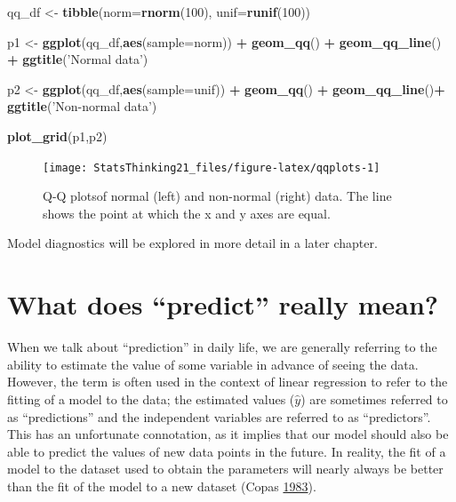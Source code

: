 \documentclass[12pt,]{book}
\newenvironment{Shaded}{\begin{snugshade}}{\end{snugshade}}
\newcommand{\DataTypeTok}[1]{\textcolor[rgb]{0.13,0.29,0.53}{#1}}
\newcommand{\DecValTok}[1]{\textcolor[rgb]{0.00,0.00,0.81}{#1}}
\newcommand{\KeywordTok}[1]{\textcolor[rgb]{0.13,0.29,0.53}{\textbf{#1}}}
\newcommand{\NormalTok}[1]{#1}
\newcommand{\OperatorTok}[1]{\textcolor[rgb]{0.81,0.36,0.00}{\textbf{#1}}}
\newcommand{\StringTok}[1]{\textcolor[rgb]{0.31,0.60,0.02}{#1}}
\theoremstyle{definition}
\theoremstyle{definition}
\theoremstyle{definition}
\theoremstyle{remark}
\begin{document}
\begin{Shaded}
\begin{Highlighting}[]
\NormalTok{qq_df <-}\StringTok{ }\KeywordTok{tibble}\NormalTok{(}\DataTypeTok{norm=}\KeywordTok{rnorm}\NormalTok{(}\DecValTok{100}\NormalTok{),}
                \DataTypeTok{unif=}\KeywordTok{runif}\NormalTok{(}\DecValTok{100}\NormalTok{))}

\NormalTok{p1 <-}\StringTok{ }\KeywordTok{ggplot}\NormalTok{(qq_df,}\KeywordTok{aes}\NormalTok{(}\DataTypeTok{sample=}\NormalTok{norm)) }\OperatorTok{+}\StringTok{ }
\StringTok{  }\KeywordTok{geom_qq}\NormalTok{() }\OperatorTok{+}\StringTok{ }
\StringTok{  }\KeywordTok{geom_qq_line}\NormalTok{() }\OperatorTok{+}\StringTok{ }
\StringTok{  }\KeywordTok{ggtitle}\NormalTok{(}\StringTok{'Normal data'}\NormalTok{)}

\NormalTok{p2 <-}\StringTok{ }\KeywordTok{ggplot}\NormalTok{(qq_df,}\KeywordTok{aes}\NormalTok{(}\DataTypeTok{sample=}\NormalTok{unif)) }\OperatorTok{+}\StringTok{ }
\StringTok{  }\KeywordTok{geom_qq}\NormalTok{() }\OperatorTok{+}\StringTok{ }
\StringTok{  }\KeywordTok{geom_qq_line}\NormalTok{()}\OperatorTok{+}\StringTok{ }
\StringTok{  }\KeywordTok{ggtitle}\NormalTok{(}\StringTok{'Non-normal data'}\NormalTok{)}

\KeywordTok{plot_grid}\NormalTok{(p1,p2)}
\end{Highlighting}
\end{Shaded}

\begin{figure}
\texttt{[image: StatsThinking21\_files/figure-latex/qqplots-1]} \caption{Q-Q plotsof normal (left) and non-normal (right) data.  The line shows the point at which the x and y axes are equal.}\label{fig:qqplots}
\end{figure}

Model diagnostics will be explored in more detail in a later chapter.

\hypertarget{what-does-predict-really-mean}{%
\section{What does ``predict'' really mean?}\label{what-does-predict-really-mean}}

When we talk about ``prediction'' in daily life, we are generally referring to the ability to estimate the value of some variable in advance of seeing the data. However, the term is often used in the context of linear regression to refer to the fitting of a model to the data; the estimated values (\(\hat{y}\)) are sometimes referred to as ``predictions'' and the independent variables are referred to as ``predictors''. This has an unfortunate connotation, as it implies that our model should also be able to predict the values of new data points in the future. In reality, the fit of a model to the dataset used to obtain the parameters will nearly always be better than the fit of the model to a new dataset (Copas \protect\hyperlink{ref-copa:1983}{1983}).
\end{document}
